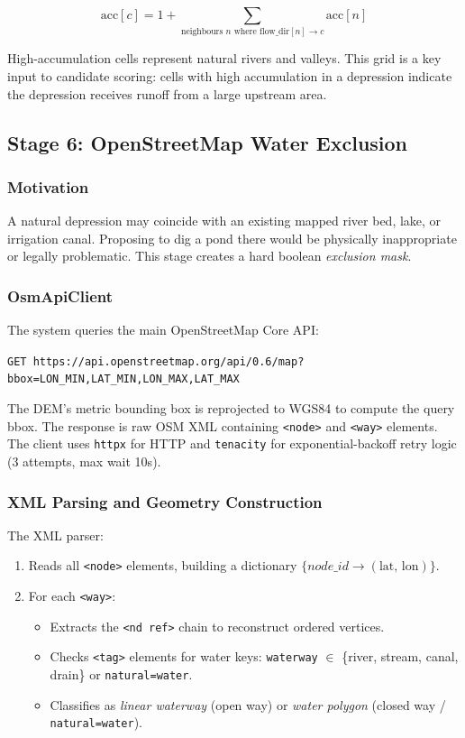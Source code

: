 \documentclass[12pt,a4paper]{article}
\begin{document}
\begin{equation}
    \text{acc}[c] = 1 + \sum_{\text{neighbours } n \text{ where flow\_dir}[n] \to c}
                         \text{acc}[n]
\end{equation}

High-accumulation cells represent natural rivers and valleys. This grid is a key input
to candidate scoring: cells with high accumulation in a depression indicate the
depression receives runoff from a large upstream area.

\subsection{Stage 6: OpenStreetMap Water Exclusion}

\subsubsection{Motivation}
A natural depression may coincide with an existing mapped river bed, lake, or irrigation
canal. Proposing to dig a pond there would be physically inappropriate or legally
problematic. This stage creates a hard boolean \emph{exclusion mask}.

\subsubsection{OsmApiClient}
The system queries the main OpenStreetMap Core API:
\begin{center}
    \texttt{GET https://api.openstreetmap.org/api/0.6/map?bbox=LON\_MIN,LAT\_MIN,LON\_MAX,LAT\_MAX}
\end{center}
The DEM's metric bounding box is reprojected to WGS84 to compute the query bbox. The
response is raw OSM XML containing \texttt{<node>} and \texttt{<way>} elements.
The client uses \texttt{httpx} for HTTP and \texttt{tenacity} for exponential-backoff
retry logic (3 attempts, max wait 10s).

\subsubsection{XML Parsing and Geometry Construction}
The XML parser:
\begin{enumerate}
    \item Reads all \texttt{<node>} elements, building a dictionary
          $\{\textit{node\_id} \to (\text{lat},\, \text{lon})\}$.
    \item For each \texttt{<way>}:
    \begin{itemize}
        \item Extracts the \texttt{<nd ref>} chain to reconstruct ordered vertices.
        \item Checks \texttt{<tag>} elements for water keys:
              \texttt{waterway} $\in$ \{river, stream, canal, drain\} or
              \texttt{natural=water}.
        \item Classifies as \emph{linear waterway} (open way) or \emph{water polygon}
              (closed way / \texttt{natural=water}).
    \end{itemize}
\end{enumerate}
\end{document}
